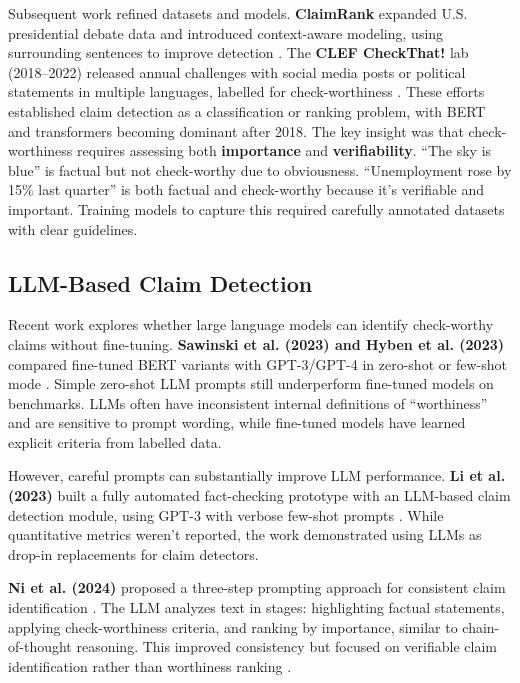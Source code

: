 \documentclass[12pt,a4paper]{article}
\begin{document}
Subsequent work refined datasets and models. \textbf{ClaimRank} expanded U.S. presidential debate data and introduced context-aware modeling, using surrounding sentences to improve detection \citep{gencheva2017claimrank}. The \textbf{CLEF CheckThat!} lab (2018--2022) released annual challenges with social media posts or political statements in multiple languages, labelled for check-worthiness \citep{thorne2018fever}. These efforts established claim detection as a classification or ranking problem, with BERT and transformers becoming dominant after 2018. The key insight was that check-worthiness requires assessing both \textbf{importance} and \textbf{verifiability}. ``The sky is blue'' is factual but not check-worthy due to obviousness. ``Unemployment rose by 15\% last quarter'' is both factual and check-worthy because it's verifiable and important. Training models to capture this required carefully annotated datasets with clear guidelines.

\subsection{LLM-Based Claim Detection}

Recent work explores whether large language models can identify check-worthy claims without fine-tuning. \textbf{Sawinski et al. (2023) and Hyben et al. (2023)} compared fine-tuned BERT variants with GPT-3/GPT-4 in zero-shot or few-shot mode \citep{sawinski2024comparison}. Simple zero-shot LLM prompts still underperform fine-tuned models on benchmarks. LLMs often have inconsistent internal definitions of ``worthiness'' and are sensitive to prompt wording, while fine-tuned models have learned explicit criteria from labelled data.

However, careful prompts can substantially improve LLM performance. \textbf{Li et al. (2023)} built a fully automated fact-checking prototype with an LLM-based claim detection module, using GPT-3 with verbose few-shot prompts \citep{li2023llmclaimdetection}. While quantitative metrics weren't reported, the work demonstrated using LLMs as drop-in replacements for claim detectors.

\textbf{Ni et al. (2024)} proposed a three-step prompting approach for consistent claim identification \citep{ni2024threestep}. The LLM analyzes text in stages: highlighting factual statements, applying check-worthiness criteria, and ranking by importance, similar to chain-of-thought reasoning. This improved consistency but focused on verifiable claim identification rather than worthiness ranking \citep{ni2024verifiable}.
\end{document}

